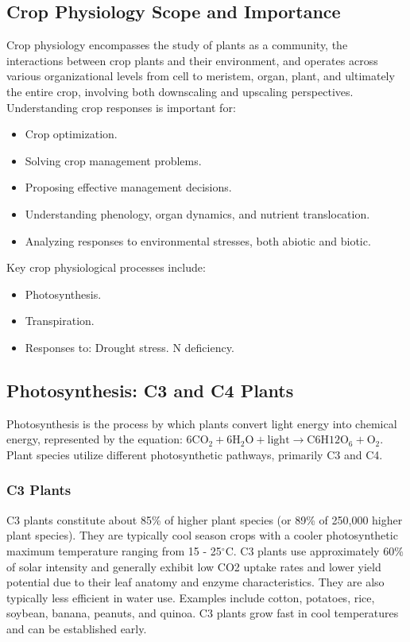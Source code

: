 \subsection{Crop Physiology Scope and Importance} 
Crop physiology encompasses the study of plants as a community, the interactions between crop plants and their environment, and operates across various organizational levels from cell to meristem, organ, plant, and ultimately the entire crop, involving both downscaling and upscaling perspectives.
Understanding crop responses is important for: 
\begin{itemize} 
    \item Crop optimization. 
    \item Solving crop management problems. 
    \item Proposing effective management decisions. 
    \item Understanding phenology, organ dynamics, and nutrient translocation. 
    \item Analyzing responses to environmental stresses, both abiotic and biotic. 
\end{itemize} 

\vspace*{1em}
Key crop physiological processes include: 
\begin{itemize} 
    \item Photosynthesis. 
    \item Transpiration. 
    \item Responses to: 
        \subitem Drought stress. 
        \subitem N deficiency. 
\end{itemize}

\subsection{Photosynthesis: C3 and C4 Plants} 
Photosynthesis is the process by which plants convert light energy into chemical energy, represented by the equation: $\text{6CO}_2 + \text{6H}_2\text{O} + \text{light} \rightarrow \text{C}6\text{H}{12}\text{O}_6 + \text{O}_2$. Plant species utilize different photosynthetic pathways, primarily C3 and C4.

\subsubsection*{C3 Plants} 
C3 plants constitute about 85\% of higher plant species (or 89\% of 250,000 higher plant species). They are typically cool season crops with a cooler photosynthetic maximum temperature ranging from 15 - 25$^{\circ}$C. C3 plants use approximately 60\% of solar intensity and generally exhibit low CO2 uptake rates and lower yield potential due to their leaf anatomy and enzyme characteristics. They are also typically less efficient in water use. Examples include cotton, potatoes, rice, soybean, banana, peanuts, and quinoa. C3 plants grow fast in cool temperatures and can be established early.

